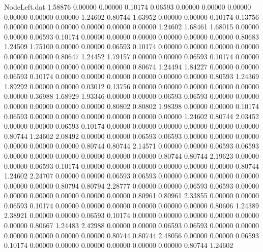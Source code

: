 \begin{filecontents}{NodeLeft.dat}
   1.58876    0.00000    0.00000     0.10174    0.06593    0.00000    0.00000    0.00000    0.00000    0.00000    0.00000    1.24602    0.80744
   1.63952    0.00000    0.00000     0.10174    0.13756    0.00000    0.00000    0.00000    0.00000    0.00000    0.00000    1.24602    1.68461
   1.68015    0.00000    0.00000     0.06593    0.10174    0.00000    0.00000    0.00000    0.00000    0.00000    0.00000    0.80683    1.24509
   1.75100    0.00000    0.00000     0.06593    0.10174    0.00000    0.00000    0.00000    0.00000    0.00000    0.00000    0.80647    1.24452
   1.79157    0.00000    0.00000     0.06593    0.10174    0.00000    0.00000    0.00000    0.00000    0.00000    0.00000    0.80674    1.24494
   1.84227    0.00000    0.00000     0.06593    0.10174    0.00000    0.00000    0.00000    0.00000    0.00000    0.00000    0.80593    1.24369
   1.89292    0.00000    0.00000     0.03012    0.13756    0.00000    0.00000    0.00000    0.00000    0.00000    0.00000    0.36988    1.68929
   1.93346    0.00000    0.00000     0.06593    0.06593    0.00000    0.00000    0.00000    0.00000    0.00000    0.00000    0.80802    0.80802
   1.98398    0.00000    0.00000     0.10174    0.06593    0.00000    0.00000    0.00000    0.00000    0.00000    0.00000    1.24602    0.80744
   2.03452    0.00000    0.00000     0.06593    0.10174    0.00000    0.00000    0.00000    0.00000    0.00000    0.00000    0.80744    1.24602
   2.08492    0.00000    0.00000     0.06593    0.06593    0.00000    0.00000    0.00000    0.00000    0.00000    0.00000    0.80744    0.80744
   2.14571    0.00000    0.00000     0.06593    0.06593    0.00000    0.00000    0.00000    0.00000    0.00000    0.00000    0.80744    0.80744
   2.19623    0.00000    0.00000     0.06593    0.10174    0.00000    0.00000    0.00000    0.00000    0.00000    0.00000    0.80744    1.24602
   2.24707    0.00000    0.00000     0.06593    0.06593    0.00000    0.00000    0.00000    0.00000    0.00000    0.00000    0.80794    0.80794
   2.28777    0.00000    0.00000     0.06593    0.06593    0.00000    0.00000    0.00000    0.00000    0.00000    0.00000    0.80961    0.80961
   2.33855    0.00000    0.00000     0.06593    0.10174    0.00000    0.00000    0.00000    0.00000    0.00000    0.00000    0.80606    1.24389
   2.38921    0.00000    0.00000     0.06593    0.10174    0.00000    0.00000    0.00000    0.00000    0.00000    0.00000    0.80667    1.24483
   2.42988    0.00000    0.00000     0.06593    0.06593    0.00000    0.00000    0.00000    0.00000    0.00000    0.00000    0.80744    0.80744
   2.48056    0.00000    0.00000     0.06593    0.10174    0.00000    0.00000    0.00000    0.00000    0.00000    0.00000    0.80744    1.24602

\end{filecontents}
